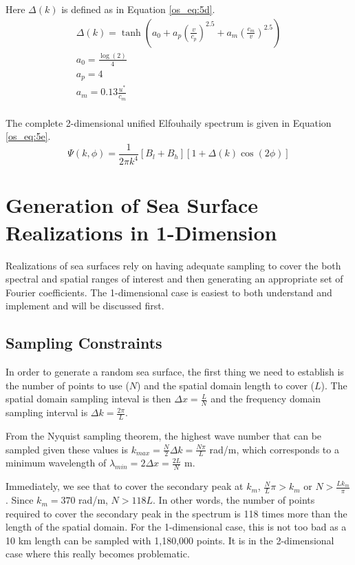 Here $\Delta(k)$ is defined as in Equation \ref{os_eq:5d}.
\begin{equation}
\label{os_eq:5d}
\begin{gathered}
\Delta(k) = \tanh\left( a_0 + a_p\left(\frac{v}{c_p}\right)^{2.5}  + a_m\left(\frac{c_m}{v} \right)^{2.5}\right)\\
a_0 = \frac{\log(2)}{4} \\
a_p = 4\\
a_m = 0.13\frac{u^*}{c_m} \\
\end{gathered}
\end{equation}
\renewcommand{\baselinestretch}{2} \small\normalsize

The complete 2-dimensional unified Elfouhaily spectrum is given in Equation \ref{os_eq:5e}.
\begin{equation}
\label{os_eq:5e}
\boxed{\Psi(k,\phi) = \frac{1}{2\pi k^4}\left[B_l + B_h \right] \left[1 + \Delta(k)\cos(2\phi) \right]}
\end{equation}

\section{Generation of Sea Surface Realizations in 1-Dimension}
Realizations of sea surfaces rely on having adequate sampling to cover the both spectral and spatial ranges of interest and then generating an appropriate set of Fourier coefficients. The 1-dimensional case is easiest to both understand and implement and will be discussed first.

\subsection{Sampling Constraints}\label{os_label:1d_sampling_constraints}
In order to generate a random sea surface,  the first thing we need to establish is the number of points to use ($N$) and the spatial domain length to cover ($L$). The spatial domain sampling inteval is then $\Delta x = \frac{L}{N}$ and the frequency domain sampling interval is $\Delta k = \frac{2\pi}{L}$. 

From the Nyquist sampling theorem, the highest wave number that can be sampled given these values is $k_{max} = \frac{N}{2}\Delta k = \frac{N\pi}{L}$ rad/m, which corresponds to a minimum wavelength of $\lambda_{min} = 2\Delta x = \frac{2L}{N}$ m.

Immediately, we see that to cover the secondary peak at $k_m$, $\frac{N}{L}\pi > k_m$ or $N > \frac{Lk_m}{\pi}$. Since $k_m = 370$ rad/m, $N > 118L$. In other words, the number of points required to cover the secondary peak in the spectrum is 118 times more than the length of the spatial domain. For the 1-dimensional case, this is not too bad as a 10 km length can be sampled with 1,180,000 points. It is in the 2-dimensional case where this really becomes problematic.

